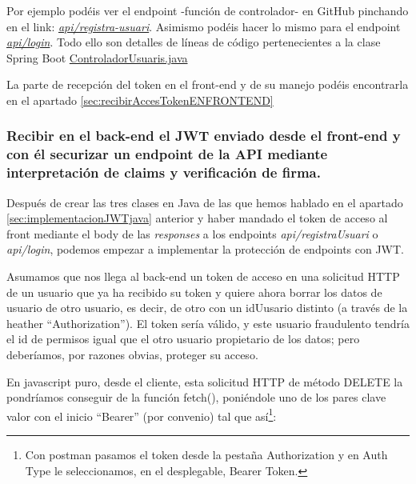 \documentclass[a4paper,12pt]{report}
\begin{document}
		Por ejemplo podéis ver el endpoint -función de controlador- en GitHub pinchando en el link: \href{https://github.com/blackcub3s/mercApp/blob/78c9f573613d94a9d9de6ee046aa5d6f02f0f425/APP%20WEB/__springboot__produccio__/app/src/main/java/miApp/app/Usuaris/controlador/UsuariControlador.java#L119-L123}{\textit{api/registra-usuari}}. Asimismo podéis hacer lo mismo para el endpoint \href{https://github.com/blackcub3s/mercApp/blob/78c9f573613d94a9d9de6ee046aa5d6f02f0f425/APP%20WEB/__springboot__produccio__/app/src/main/java/miApp/app/Usuaris/controlador/UsuariControlador.java#L103-L107}{\textit{api/login}}. Todo ello son detalles de líneas de código pertenecientes a la clase Spring Boot \href{https://github.com/blackcub3s/mercApp/blob/main/APP%20WEB/__springboot__produccio__/app/src/main/java/miApp/app/Usuaris/controlador/UsuariControlador.java}{ControladorUsuaris.java}
	
		
		La parte de recepción del token en el front-end y de su manejo podéis encontrarla en el apartado \ref{sec:recibirAccesTokenENFRONTEND}

		
		
		
		
		
		
	
		
		\subsubsection{Recibir en el back-end el JWT enviado desde el front-end y con él securizar un endpoint de la API mediante interpretación de claims y verificación de firma.}
		\label{sec:classesSecuritzacioClaimsIfirma}
		
		Después de crear las tres clases en Java de las que hemos hablado en el apartado \ref{sec:implementacionJWTjava} anterior y haber mandado el token de acceso al front mediante el body de las \textit{responses} a los endpoints \textit{api/registraUsuari} o \textit{api/login}, podemos empezar a 
		implementar la protección de endpoints con JWT. 
		
		Asumamos que nos llega al back-end un token de acceso en una solicitud HTTP de un usuario que ya ha recibido su token y quiere ahora borrar los datos de usuario de otro usuario, es decir, de otro con un idUusario distinto (a través de la heather ``Authorization''). El token sería válido, y este usuario fraudulento tendría el id de permisos igual que el otro usuario propietario de los datos; pero deberíamos, por razones obvias, proteger su acceso.
	
		
		En javascript puro, desde el cliente, esta solicitud HTTP de método DELETE la pondríamos conseguir de la función fetch(), poniéndole uno de los pares clave valor con el inicio ``Bearer'' (por convenio) tal que así\footnote{Con postman pasamos el token desde la pestaña Authorization y en Auth Type le seleccionamos, en el desplegable, Bearer Token.}:
		
\end{document}
